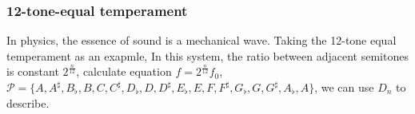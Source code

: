 \documentclass[10pt,a4paper]{article}
\begin{document}
\subsubsection{12-tone-equal temperament}
In physics, the essence of sound is a mechanical wave. Taking the 12-tone equal temperament as an exapmle,
In this system, the ratio between adjacent semitones is constant $2^{\frac{n}{12}}$, calculate equation $f=2^{\frac{n}{12}}f_0$, 
$\mathscr{P}=\{A,A^{\sharp},B_{\flat},B,C,C^{\sharp},D_{\flat},D,D^{\sharp},E_{\flat},E,F,F^{\sharp},G_{\flat},G,G^{\sharp},A_{\flat},A\}$,
we can use $D_n$ to describe.
\end{document}
